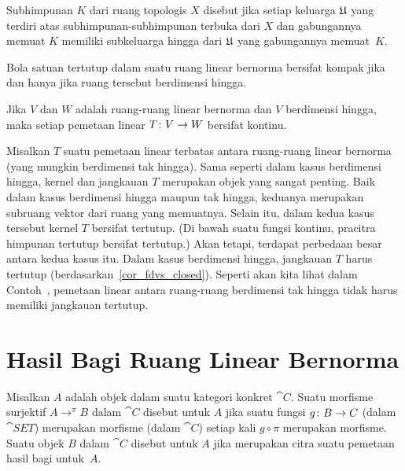 \begin{defn} Subhimpunan $K$ dari ruang topologis $X$ disebut
 jika setiap keluarga $\mathfrak{U}$ yang terdiri atas subhimpunan-subhimpunan terbuka dari $X$ dan gabungannya memuat $K$ memiliki
subkeluarga hingga dari $\mathfrak{U}$ yang gabungannya memuat~$K$.
\end{defn}

\begin{prop}\label{00015032} Bola satuan tertutup dalam suatu ruang linear bernorma bersifat kompak jika dan hanya jika
ruang tersebut berdimensi hingga.
\end{prop}

\begin{prop}\label{00015033} Jika $V$ dan $W$ adalah ruang-ruang linear bernorma dan $V$ berdimensi hingga, maka
setiap pemetaan linear $T \colon V \rightarrow W$ bersifat kontinu.
\end{prop}

Misalkan $T$ suatu pemetaan linear terbatas antara ruang-ruang linear bernorma (yang mungkin berdimensi tak hingga). Sama seperti dalam kasus
berdimensi hingga, kernel dan jangkauan $T$ merupakan objek yang sangat penting. Baik dalam kasus berdimensi hingga maupun tak hingga,
keduanya merupakan subruang vektor dari ruang yang memuatnya. Selain itu, dalam kedua kasus tersebut kernel $T$ bersifat tertutup.
(Di bawah suatu fungsi kontinu, pracitra himpunan tertutup bersifat tertutup.) Akan tetapi, terdapat perbedaan besar antara
kedua kasus itu. Dalam kasus berdimensi hingga, jangkauan $T$ harus tertutup (berdasarkan~\ref{cor_fdvs_closed}). Seperti akan kita lihat
dalam Contoh~, pemetaan linear antara ruang-ruang berdimensi tak hingga tidak harus memiliki jangkauan tertutup.

\section{Hasil Bagi Ruang Linear Bernorma}

\begin{defn}\label{quo001def} Misalkan $A$ adalah objek dalam suatu kategori konkret $\cat C$.
Suatu morfisme surjektif $A \to^\pi B$ dalam $\cat C$ disebut
 untuk $A$ jika suatu fungsi $g\colon B \rightarrow C$ (dalam $\cat{SET}$) merupakan morfisme
(dalam $\cat C$) setiap kali $g \circ \pi$ merupakan morfisme. Suatu objek $B$ dalam $\cat C$ disebut
 untuk $A$ jika merupakan citra suatu pemetaan hasil bagi untuk~$A$.
\end{defn}

